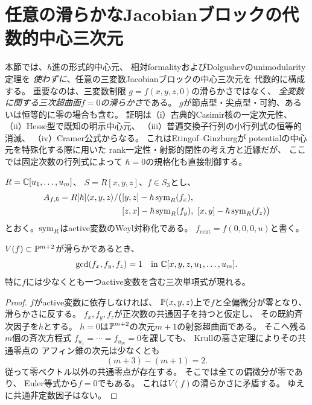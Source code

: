 \section{任意の滑らかなJacobianブロックの代数的中心三次元}
\label{sec:pg-universal-determinant}
本節では、$\hbar$進の形式的中心元、
相対formalityおよびDolgushevのunimodularity定理を
\emph{使わずに}、任意の三変数Jacobianブロックの中心三次元を
代数的に構成する。
重要なのは、三変数制限
$g=f(x,y,z,0)$の滑らかさではなく、
\emph{全変数に関する三次超曲面$f=0$の滑らかさ}である。
$g$が節点型・尖点型・可約、あるいは恒等的に零の場合も含む。
証明は（i）古典的Casimir核の一定次元性、
（ii）Hesse型で既知の明示中心元、
（iii）普遍交換子行列の小行列式の恒等的消滅、
（iv）Cramer公式からなる。
これはEtingof--Ginzburg\cite[\S8.3]{EG}が
potentialの中心元を特殊化する際に用いた
rank一定性・射影的閉性の考え方と近縁だが、
ここでは固定次数の行列式によって
$\hbar=0$の規格化も直接制御する。

$R=\mathbb C[u_1,\ldots,u_m]$、
$S=R[x,y,z]$、$f\in S_3$とし、
\begin{equation}
 \begin{aligned}
 A_{f,\hbar}
 =R[\hbar]\langle x,y,z\rangle/
 \bigl(&[y,z]-\hbar\operatorname{sym}_R(f_x),\\
       &[z,x]-\hbar\operatorname{sym}_R(f_y),\
       [x,y]-\hbar\operatorname{sym}_R(f_z)\bigr)
 \end{aligned}
 \label{eq:pg-det-quantum}
\end{equation}
とおく。$\operatorname{sym}_R$はactive変数のWeyl対称化である。
$f_{\mathrm{cent}}=f(0,0,0,u)$と書く。

\begin{lemma}[滑らかさとactive偏微分の最大公約因子]
\label{lem:pg-det-gradient-coprime}
$V(f)\subset\mathbb P^{m+2}$が滑らかであるとき、
\begin{equation}
 \gcd(f_x,f_y,f_z)=1
 \quad\text{in }\mathbb C[x,y,z,u_1,\ldots,u_m].
 \label{eq:pg-det-gradient-coprime}
\end{equation}
特に$f$には少なくとも一つactive変数を含む三次単項式が現れる。
\end{lemma}
\begin{proof}
$f$がactive変数に依存しなければ、
$\mathbb P(x,y,z)$上で$f$と全偏微分が零となり、
滑らかさに反する。
$f_x,f_y,f_z$が正次数の共通因子を持つと仮定し、
その既約斉次因子を$h$とする。
$h=0$は$\mathbb P^{m+2}$の次元$m+1$の射影超曲面である。
そこへ残る$m$個の斉次方程式
$f_{u_1}=\cdots=f_{u_m}=0$を課しても、
Krullの高さ定理によりその共通零点の
アフィン錐の次元は少なくとも
\begin{equation}
 (m+3)-(m+1)=2.
 \label{eq:pg-det-gradient-dimension}
\end{equation}
従って零ベクトル以外の共通零点が存在する。
そこでは全ての偏微分が零であり、
Euler等式から$f=0$でもある。
これは$V(f)$の滑らかさに矛盾する。
ゆえに共通非定数因子はない。
\end{proof}

